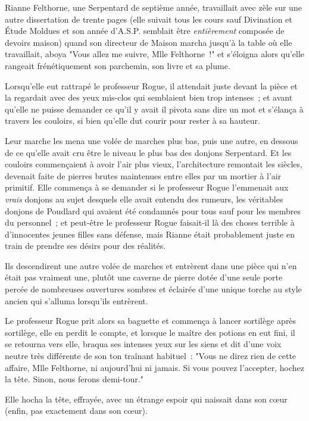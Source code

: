 \later

Rianne Felthorne, une Serpentard de septième année, travaillait avec zèle sur une autre dissertation de trente pages (elle suivait tous les cours sauf Divination et Étude Moldues et son année d'A.S.P. semblait être \emph{entièrement} composée de devoirs maison) quand son directeur de Maison marcha jusqu'à la table où elle travaillait, aboya "Vous allez me suivre, Mlle Felthorne~!" et s'éloigna alors qu'elle rangeait frénétiquement son parchemin, son livre et sa plume.

Lorsqu'elle eut rattrapé le professeur Rogue, il attendait juste devant la pièce et la regardait avec des yeux mis-clos qui semblaient bien trop intenses~; et avant qu'elle ne puisse demander ce qu'il y avait il pivota sans dire un mot et s'élança à travers les couloirs, si bien qu'elle dut courir pour rester à sa hauteur.

Leur marche les mena une volée de marches plus bas, puis une autre, en dessous de ce qu'elle avait cru être le niveau le plus bas des donjons Serpentard. Et les couloirs commençaient à avoir l'air plus vieux, l'architecture remontait les siècles, devenait faite de pierres brutes maintenues entre elles par un mortier à l'air primitif. Elle commença à se demander si le professeur Rogue l'emmenait aux \emph{vrais} donjons au sujet desquels elle avait entendu des rumeurs, les véritables donjons de Poudlard qui avaient été condamnés pour tous sauf pour les membres du personnel~; et peut-être le professeur Rogue faisait-il là des choses terrible à d'innocentes jeunes filles sans défense, mais Rianne était probablement juste en train de prendre ses désirs pour des réalités.

Ils descendirent une autre volée de marches et entrèrent dans une pièce qui n'en était pas vraiment une, plutôt une caverne de pierre dotée d'une seule porte percée de nombreuses ouvertures sombres et éclairée d'une unique torche au style ancien qui s'alluma lorsqu'ils entrèrent.

Le professeur Rogue prit alors sa baguette et commença à lancer sortilège après sortilège, elle en perdit le compte, et lorsque le maître des potions en eut fini, il se retourna vers elle, braqua ses intenses yeux sur les siens et dit d'une voix neutre très différente de son ton traînant habituel~: "Vous ne direz rien de cette affaire, Mlle Felthorne, ni aujourd'hui ni jamais. Si vous pouvez l'accepter, hochez la tête. Sinon, nous ferons demi-tour."

Elle hocha la tête, effrayée, avec un étrange espoir qui naissait dans son cœur (enfin, pas exactement dans son cœur).

